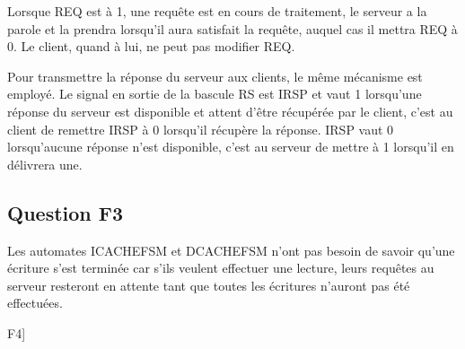 \documentclass{article}
\begin{document}
Lorsque REQ est à 1, une requête est en cours de traitement, le serveur a la
parole et la prendra lorsqu'il aura satisfait la requête, auquel cas il mettra
REQ à 0. Le client, quand à lui, ne peut pas modifier REQ.


Pour transmettre la réponse du serveur aux clients, le même mécanisme est
employé. Le signal en sortie de la bascule RS est IRSP et vaut 1 lorsqu'une
réponse du serveur est disponible et attent d'être récupérée par le client,
c'est au client de remettre IRSP à 0 lorsqu'il récupère la réponse.
IRSP vaut 0 lorsqu'aucune réponse n'est disponible, c'est au serveur de mettre
à 1 lorsqu'il en délivrera une.

\subsection{Question F3}

Les automates ICACHEFSM et DCACHEFSM n'ont pas besoin de savoir qu'une écriture
s'est terminée car s'ils veulent effectuer une lecture, leurs requêtes au
serveur resteront en attente tant que toutes les écritures n'auront pas été
effectuées.

F4]
\end{document}
